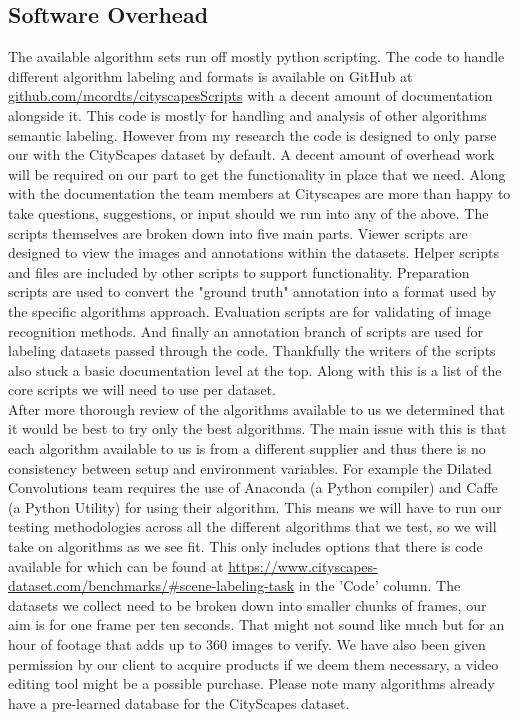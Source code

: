 \subsection{Software Overhead}
The available algorithm sets run off mostly python scripting. 
The code to handle different algorithm labeling and formats is available on GitHub at \url{github.com/mcordts/cityscapesScripts} with a decent amount of documentation alongside it. 
This code is mostly for handling and analysis of other algorithms semantic labeling. However from my research the code is designed to only parse our with the CityScapes dataset by default. 
A decent amount of overhead work will be required on our part to get the functionality in place that we need.
Along with the documentation the team members at Cityscapes are more than happy to take questions, suggestions, or input should we run into any of the above.
The scripts themselves are broken down into five main parts. 
Viewer scripts are designed to view the images and annotations within the datasets. 
Helper scripts and files are included by other scripts to support functionality. 
Preparation scripts are used to convert the "ground truth" annotation into a format used by the specific algorithms approach. 
Evaluation scripts are for validating of image recognition methods. 
And finally an annotation branch of scripts are used for labeling datasets passed through the code.
Thankfully the writers of the scripts also stuck a basic documentation level at the top. Along with this is a list of the core scripts we will need to use per dataset.\\
After more thorough review of the algorithms available to us we determined that it would be best to try only the best algorithms. 
The main issue with this is that each algorithm available to us is from a different supplier and thus there is no consistency between setup and environment variables. 
For example the Dilated Convolutions team requires the use of Anaconda (a Python compiler) and Caffe (a Python Utility) for using their algorithm. 
This means we will have to run our testing methodologies across all the different algorithms that we test, so we will take on algorithms as we see fit. 
This only includes options that there is code available for which can be found at \url{https://www.cityscapes-dataset.com/benchmarks/#scene-labeling-task} in the 'Code' column. 
The datasets we collect need to be broken down into smaller chunks of frames, our aim is for one frame per ten seconds.
That might not sound like much but for an hour of footage that adds up to 360 images to verify.
We have also been given permission by our client to acquire products if we deem them necessary, a video editing tool might be a possible purchase. 
Please note many algorithms already have a pre-learned database for the CityScapes dataset. 


